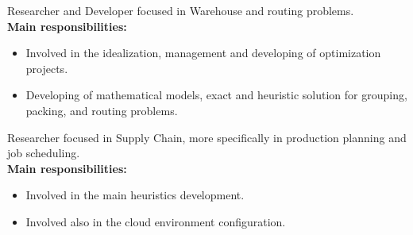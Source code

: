 \documentclass[10pt,a4paper,ragged2e,withhyper]{altacv}
\begin{document}
\begin{paracol}{2}
            {Researcher and Developer focused in Warehouse and routing problems}. \\
            \medskip
            \textbf{Main responsibilities:}
            \medskip
            \begin{itemize}
                \item Involved in the idealization, management and developing of
                  optimization projects.
                \item Developing of mathematical models, exact and heuristic
                  solution for grouping, packing, and routing problems.
            \end{itemize}
        \divider
            {Researcher focused in Supply Chain, more specifically in production
              planning and job scheduling}.\\
            \medskip
            \textbf{Main responsibilities:}
            \medskip
            \begin{itemize}
                \item Involved in the main heuristics development.
                \item Involved also in the cloud environment configuration.
            \end{itemize}

\end{paracol}
\end{document}

